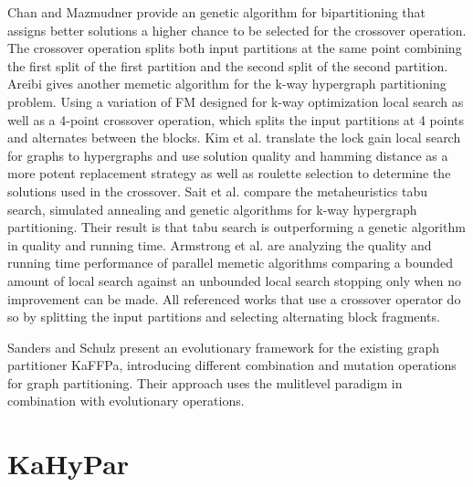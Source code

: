 \documentclass[a4paper,12pt,titlepage, BCOR7mm,headsepline]{scrbook}
\numberwithin{equation}{section}
\begin{document}
Chan and Mazmudner\cite{chan1995systolic} provide an genetic algorithm for bipartitioning that assigns better solutions a higher chance to be selected for the crossover operation. The crossover operation splits both input partitions at the same point combining the first split of the first partition and the second split of the second partition.
Areibi \cite{areibi2000integrated} gives another memetic algorithm for the k-way hypergraph partitioning problem. Using a variation of FM designed for k-way optimization \cite{sanchis1989multiple} local search as well as a 4-point crossover operation, which splits the input partitions at 4 points and alternates between the blocks.
\cite{kim2004hybrid} Kim et al. translate the lock gain local search \cite{kim2004lock} for graphs to hypergraphs and use solution quality and hamming distance as a more potent replacement strategy as well as roulette selection to determine the solutions used in the crossover.
 Sait et al. \cite{sait2006evolutionary} compare the metaheuristics tabu search, simulated annealing and genetic algorithms for k-way hypergraph partitioning. Their result is that tabu search is outperforming a genetic algorithm in quality and running time.
Armstrong et al.\cite{armstrong2010investigation} are analyzing the quality and running time performance of parallel memetic algorithms comparing a bounded amount of local search against an unbounded local search stopping only when no improvement can be made. All referenced works that use a crossover operator do so by splitting the input partitions and selecting alternating block fragments.


Sanders and Schulz present an evolutionary framework \cite{sanders2012distributed} for the existing graph partitioner KaFFPa, \cite{holtgrewe2010engineering} introducing different combination and mutation operations for graph partitioning. Their approach uses the mulitlevel paradigm in combination with evolutionary operations.

\section{KaHyPar}
\end{document}
